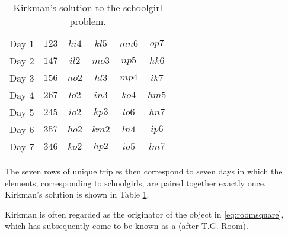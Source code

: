 \begin{table}[h!]
  \begin{center}
    \label{tab:kirkman-solution}
    \begin{tabular}{c|ccccc}
      Day 1 & $123$ & $hi4$ & $kl5$ & $mn6$ & $op7$ \\
      Day 2 & $147$ & $il2$ & $mo3$ & $np5$ & $hk6$ \\
      Day 3 & $156$ & $no2$ & $hl3$ & $mp4$ & $ik7$ \\
      Day 4 & $267$ & $lo2$ & $in3$ & $ko4$ & $hm5$ \\
      Day 5 & $245$ & $io2$ & $kp3$ & $lo6$ & $hn7$ \\
      Day 6 & $357$ & $ho2$ & $km2$ & $ln4$ & $ip6$ \\
      Day 7 & $346$ & $ko2$ & $hp2$ & $io5$ & $lm7$
    \end{tabular}
  \end{center}
  \caption{Kirkman's solution to the schoolgirl problem.}
\end{table}

The seven rows of unique triples then correspond to seven days in which the elements, corresponding to schoolgirls, are paired together exactly once.
Kirkman's solution is shown in Table \ref{tab:kirkman-solution}.

Kirkman is often regarded as the originator of the object in \eqref{eq:roomsquare}, which has subsequently come to be known as a  (after T.G. Room).

